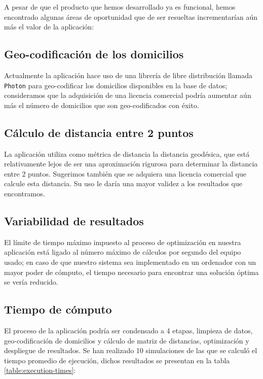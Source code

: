 \documentclass[journal]{IEEEtran}
\begin{document}
        A pesar de que el producto que hemos desarrollado ya es funcional, hemos encontrado algunas áreas de oportunidad que de ser resueltas incrementarían aún más el valor de la aplicación:
        
        \subsection{Geo-codificación de los domicilios}
            
            Actualmente la aplicación hace uso de una librería de libre distribución llamada \texttt{Photon} para geo-codificar los domicilios disponibles en la base de datos; consideramos que la adquisición de una licencia comercial podría aumentar aún más el número de domicilios que son geo-codificados con éxito.
            
        \subsection{Cálculo de distancia entre 2 puntos}
            
            La aplicación utiliza como métrica de distancia la distancia geodésica, que está relativamente lejos de ser una aproximación rigurosa para determinar la distancia entre 2 puntos. Sugerimos también que se adquiera una licencia comercial que calcule esta distancia. Su uso le daría una mayor validez a los resultados que encontramos.
        
        \subsection{Variabilidad de resultados}

            El límite de tiempo máximo impuesto al proceso de optimización en nuestra aplicación está ligado al número máximo de cálculos por segundo del equipo usado; en caso de que nuestro sistema sea implementado en un ordenador con un mayor poder de cómputo, el tiempo necesario para encontrar una solución óptima se vería reducido.

        \subsection{Tiempo de cómputo}

            El proceso de la aplicación podría ser condensado a 4 etapas, limpieza de datos, geo-codificación de domicilios y cálculo de matriz de distancias, optimización y despliegue de resultados. Se han realizado 10 simulaciones de las que se calculó el tiempo promedio de ejecución, dichos resultados se presentan en la tabla \ref{table:execution-times}:
\end{document}
